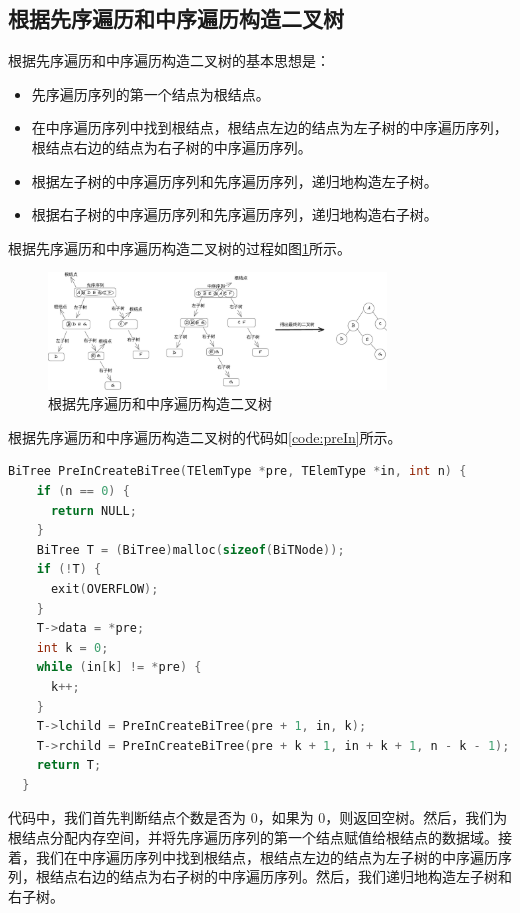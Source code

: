 \documentclass[lang=cn,newtx,10pt,scheme=chinese]{../elegantbook}
\begin{document}
\subsection{根据先序遍历和中序遍历构造二叉树}

根据先序遍历和中序遍历构造二叉树的基本思想是：

\begin{itemize}
  \item 先序遍历序列的第一个结点为根结点。
  \item 在中序遍历序列中找到根结点，根结点左边的结点为左子树的中序遍历序列，根结点右边的结点为右子树的中序遍历序列。
  \item 根据左子树的中序遍历序列和先序遍历序列，递归地构造左子树。
  \item 根据右子树的中序遍历序列和先序遍历序列，递归地构造右子树。
  \end{itemize}

根据先序遍历和中序遍历构造二叉树的过程如图\ref{fig:preIn}所示。

\begin{figure}[h]
  \centering
  \includegraphics[width=0.8\textwidth]{./figure/pdf/cropped/pre+in.pdf}
  \caption{根据先序遍历和中序遍历构造二叉树}
  \label{fig:preIn}
\end{figure}

根据先序遍历和中序遍历构造二叉树的代码如\ref{code:preIn}所示。

\begin{lstlisting}[language=C++, caption={根据先序遍历和中序遍历构造二叉树}, label={code:preIn}]
  BiTree PreInCreateBiTree(TElemType *pre, TElemType *in, int n) {
    if (n == 0) {
      return NULL;
    }
    BiTree T = (BiTree)malloc(sizeof(BiTNode));
    if (!T) {
      exit(OVERFLOW);
    }
    T->data = *pre;
    int k = 0;
    while (in[k] != *pre) {
      k++;
    }
    T->lchild = PreInCreateBiTree(pre + 1, in, k);
    T->rchild = PreInCreateBiTree(pre + k + 1, in + k + 1, n - k - 1);
    return T;
  }
\end{lstlisting}

代码中，我们首先判断结点个数是否为 0，如果为 0，则返回空树。然后，我们为根结点分配内存空间，并将先序遍历序列的第一个结点赋值给根结点的数据域。接着，我们在中序遍历序列中找到根结点，根结点左边的结点为左子树的中序遍历序列，根结点右边的结点为右子树的中序遍历序列。然后，我们递归地构造左子树和右子树。
\end{document}

